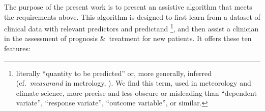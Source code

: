 \documentclass[utf8]{FrontiersinHarvard_mod} %
\newcommand*{\amp}{\&}
\newcommand*{\cf}{{cf.}}
\renewcommand*{\|}[1][]{\nonscript\:#1\vert\nonscript\:\mathopen{}}
\begin{document}
\medskip

The purpose of the present work is to present an assistive algorithm that meets the requirements above. This algorithm is designed to first learn from a dataset of clinical data with relevant predictors and predictand%
%
%
\footnote{literally \enquote{quantity to be predicted} or, more generally, inferred (\cf\ \emph{measurand} in metrology, \citealt[2.3]{jcgm1997_r2012}). We find this term, used in meteorology and climate science, more precise and less obscure or misleading than \enquote{dependent variate}, \enquote{response variate}, \enquote{outcome variable}, or similar.}, and then assist a clinician in the assessment of prognosis \amp\ treatment for new patients. It offers these ten features:
\end{document}
